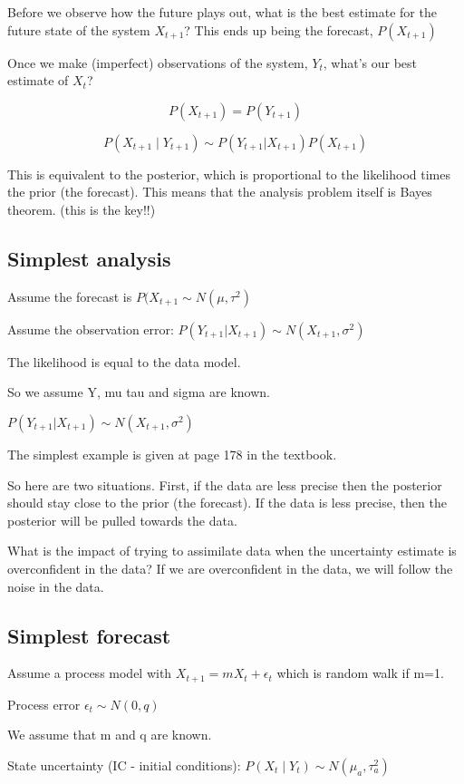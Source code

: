 \documentclass[12pt, oneside]{article}   	%
\begin{document}
Before we observe how the future plays out, what is the best estimate for the future state of the system $X_{t+1}$? This ends up being the forecast, $P(X_{t+1})$

Once we make (imperfect) observations of the system, $Y_t$, what's our best estimate of $X_t$?

$$P(X_{t+1}) = P(Y_{t+1}) $$

$$P(X_{t+1} \mid Y_{t+1}) \sim P(Y_{t+1} | X_{t+1}) P(X_{t+1}) $$

This is equivalent to the posterior, which is proportional to the likelihood times the prior (the forecast). This means that the analysis problem itself is Bayes theorem. (this is the key!!)

\subsection{Simplest analysis}

Assume the forecast is $P(X_{t+1} \sim N(\mu, \tau^2) $

Assume the observation error: $ P(Y_{t+1} | X_{t+1}) \sim N(X_{t+1}, \sigma^2) $

The likelihood is equal to the data model.

So we assume Y, mu tau and sigma are known.

$ P(Y_{t+1} | X_{t+1}) \sim N(X_{t+1}, \sigma^2) $

The simplest example is given at page 178 in the textbook.

So here are two situations. First, if the data are less precise then the posterior should stay close to the prior (the forecast). If the data is less precise, then the posterior will be pulled towards the data.

What is the impact of trying to assimilate data when the uncertainty estimate is overconfident in the data? If we are overconfident in the data, we will follow the noise in the data.

\subsection{Simplest forecast}

Assume a process model with $X_{t+1} = m X_t + \epsilon_t$ which is random walk if m=1.

Process error $\epsilon_t \sim N(0, q)$

We assume that m and q are known.

State uncertainty (IC - initial conditions): $P(X_t \mid Y_t) \sim N( \mu_a , \tau_a^2)$
\end{document}

